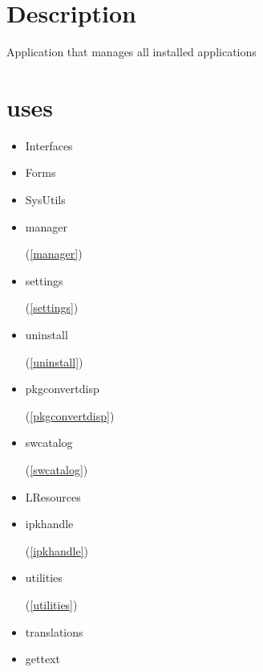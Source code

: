\documentclass{report}
\begin{document}
\section{Description}
Application that manages all installed applications
\section{uses}
\begin{itemize}
\item \begin{ttfamily}Interfaces\end{ttfamily}\item \begin{ttfamily}Forms\end{ttfamily}\item \begin{ttfamily}SysUtils\end{ttfamily}\item \begin{ttfamily}manager\end{ttfamily}(\ref{manager})\item \begin{ttfamily}settings\end{ttfamily}(\ref{settings})\item \begin{ttfamily}uninstall\end{ttfamily}(\ref{uninstall})\item \begin{ttfamily}pkgconvertdisp\end{ttfamily}(\ref{pkgconvertdisp})\item \begin{ttfamily}swcatalog\end{ttfamily}(\ref{swcatalog})\item \begin{ttfamily}LResources\end{ttfamily}\item \begin{ttfamily}ipkhandle\end{ttfamily}(\ref{ipkhandle})\item \begin{ttfamily}utilities\end{ttfamily}(\ref{utilities})\item \begin{ttfamily}translations\end{ttfamily}\item \begin{ttfamily}gettext\end{ttfamily}\end{itemize}
\end{document}

